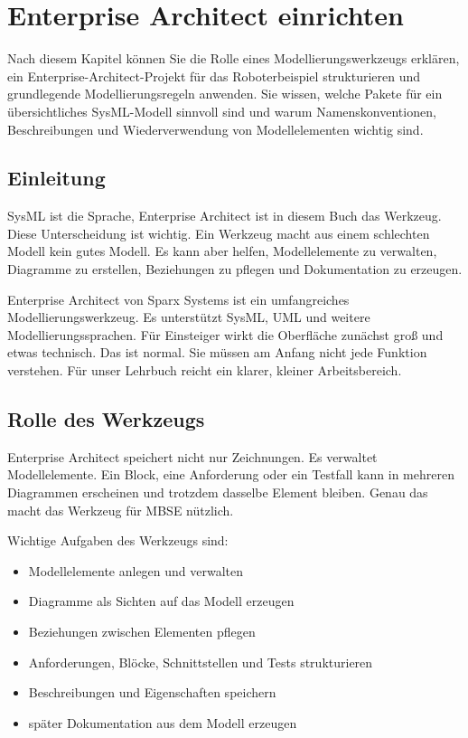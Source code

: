 \chapter{Enterprise Architect einrichten}

\begin{lernziele}
Nach diesem Kapitel können Sie die Rolle eines Modellierungswerkzeugs erklären, ein Enterprise-Architect-Projekt für das Roboterbeispiel strukturieren und grundlegende Modellierungsregeln anwenden. Sie wissen, welche Pakete für ein übersichtliches SysML-Modell sinnvoll sind und warum Namenskonventionen, Beschreibungen und Wiederverwendung von Modellelementen wichtig sind.
\end{lernziele}

\section{Einleitung}
SysML ist die Sprache, Enterprise Architect ist in diesem Buch das Werkzeug. Diese Unterscheidung ist wichtig. Ein Werkzeug macht aus einem schlechten Modell kein gutes Modell. Es kann aber helfen, Modellelemente zu verwalten, Diagramme zu erstellen, Beziehungen zu pflegen und Dokumentation zu erzeugen.

Enterprise Architect von Sparx Systems ist ein umfangreiches Modellierungswerkzeug. Es unterstützt SysML, UML und weitere Modellierungssprachen. Für Einsteiger wirkt die Oberfläche zunächst groß und etwas technisch. Das ist normal. Sie müssen am Anfang nicht jede Funktion verstehen. Für unser Lehrbuch reicht ein klarer, kleiner Arbeitsbereich.

\section{Rolle des Werkzeugs}
Enterprise Architect speichert nicht nur Zeichnungen. Es verwaltet Modellelemente. Ein Block, eine Anforderung oder ein Testfall kann in mehreren Diagrammen erscheinen und trotzdem dasselbe Element bleiben. Genau das macht das Werkzeug für MBSE nützlich.

Wichtige Aufgaben des Werkzeugs sind:

\begin{itemize}
    \item Modellelemente anlegen und verwalten
    \item Diagramme als Sichten auf das Modell erzeugen
    \item Beziehungen zwischen Elementen pflegen
    \item Anforderungen, Blöcke, Schnittstellen und Tests strukturieren
    \item Beschreibungen und Eigenschaften speichern
    \item später Dokumentation aus dem Modell erzeugen
\end{itemize}

